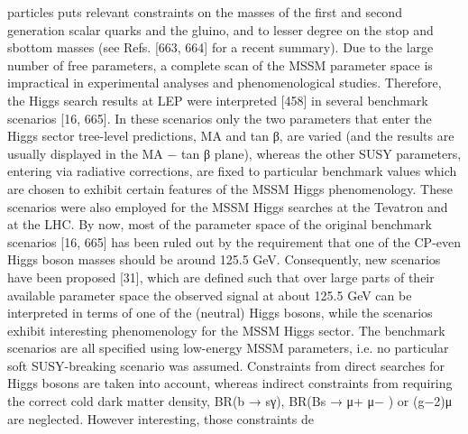 particles puts relevant constraints on the masses of the first and second generation scalar quarks and the
gluino, and to lesser degree on the stop and sbottom masses (see Refs. [663, 664] for a recent summary).
Due to the large number of free parameters, a complete scan of the MSSM parameter space is
impractical in experimental analyses and phenomenological studies. Therefore, the Higgs search results
at LEP were interpreted [458] in several benchmark scenarios [16, 665]. In these scenarios only the two
parameters that enter the Higgs sector tree-level predictions, MA and tan β, are varied (and the results are
usually displayed in the MA − tan β plane), whereas the other SUSY parameters, entering via radiative
corrections, are fixed to particular benchmark values which are chosen to exhibit certain features of the
MSSM Higgs phenomenology. These scenarios were also employed for the MSSM Higgs searches at
the Tevatron and at the LHC.
By now, most of the parameter space of the original benchmark scenarios [16, 665] has been
ruled out by the requirement that one of the CP-even Higgs boson masses should be around 125.5 GeV.
Consequently, new scenarios have been proposed [31], which are defined such that over large parts of
their available parameter space the observed signal at about 125.5 GeV can be interpreted in terms of
one of the (neutral) Higgs bosons, while the scenarios exhibit interesting phenomenology for the MSSM
Higgs sector. The benchmark scenarios are all specified using low-energy MSSM parameters, i.e. no
particular soft SUSY-breaking scenario was assumed. Constraints from direct searches for Higgs bosons
are taken into account, whereas indirect constraints from requiring the correct cold dark matter density,
BR(b → sγ), BR(Bs → μ+ μ− ) or (g−2)μ are neglected. However interesting, those constraints de
